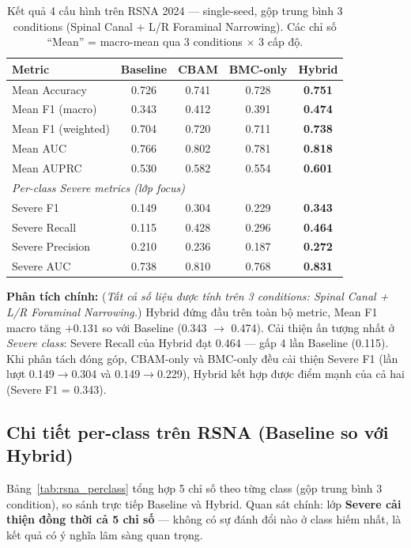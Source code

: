 \begin{table}[H]
\centering
\caption{Kết quả 4 cấu hình trên RSNA 2024 --- single-seed, gộp trung bình 3 conditions (Spinal Canal + L/R Foraminal Narrowing). Các chỉ số ``Mean'' = macro-mean qua 3 conditions $\times$ 3 cấp độ.}
\label{tab:rsna_ablation}
\renewcommand{\arraystretch}{1.2}
\setlength{\tabcolsep}{4pt}
\begin{tabular}{lcccc}
\toprule
\textbf{Metric} & \textbf{Baseline} & \textbf{CBAM} & \textbf{BMC-only} & \textbf{Hybrid} \\
\midrule
Mean Accuracy & 0.726 & 0.741 & 0.728 & \textbf{0.751} \\
Mean F1 (macro) & 0.343 & 0.412 & 0.391 & \textbf{0.474} \\
Mean F1 (weighted) & 0.704 & 0.720 & 0.711 & \textbf{0.738} \\
Mean AUC & 0.766 & 0.802 & 0.781 & \textbf{0.818} \\
Mean AUPRC & 0.530 & 0.582 & 0.554 & \textbf{0.601} \\
\midrule
\multicolumn{5}{l}{\textit{Per-class Severe metrics (lớp focus)}} \\
\midrule
Severe F1 & 0.149 & 0.304 & 0.229 & \textbf{0.343} \\
Severe Recall & 0.115 & 0.428 & 0.296 & \textbf{0.464} \\
Severe Precision & 0.210 & 0.236 & 0.187 & \textbf{0.272} \\
Severe AUC & 0.738 & 0.810 & 0.768 & \textbf{0.831} \\
\bottomrule
\end{tabular}
\end{table}

\textbf{Phân tích chính:} (\emph{Tất cả số liệu được tính trên 3 conditions: Spinal Canal + L/R Foraminal Narrowing.}) Hybrid đứng đầu trên toàn bộ metric, Mean F1 macro tăng $+0.131$ so với Baseline (0.343 $\to$ 0.474). Cải thiện ấn tượng nhất ở \emph{Severe class}: Severe Recall của Hybrid đạt 0.464 --- gấp 4 lần Baseline (0.115). Khi phân tách đóng góp, CBAM-only và BMC-only đều cải thiện Severe F1 (lần lượt 0.149$\to$0.304 và 0.149$\to$0.229), Hybrid kết hợp được điểm mạnh của cả hai (Severe F1 = 0.343).

\subsection{Chi tiết per-class trên RSNA (Baseline so với Hybrid)}
\label{subsec:rsna_perclass}

Bảng~\ref{tab:rsna_perclass} tổng hợp 5 chỉ số theo từng class (gộp trung bình 3 condition), so sánh trực tiếp Baseline và Hybrid. Quan sát chính: lớp \textbf{Severe cải thiện đồng thời cả 5 chỉ số} --- không có sự đánh đổi nào ở class hiếm nhất, là kết quả có ý nghĩa lâm sàng quan trọng.

